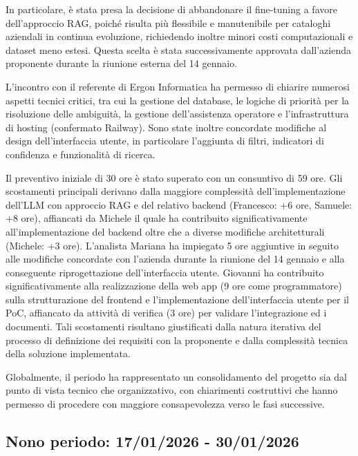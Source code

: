 \documentclass[a4paper, 11pt, oneside]{scrartcl} %
\begin{document}
In particolare, è stata presa la decisione di abbandonare il fine-tuning a favore dell'approccio RAG, poiché risulta più flessibile e manutenibile per cataloghi aziendali in continua evoluzione, richiedendo inoltre minori costi computazionali e dataset meno estesi. Questa scelta è stata successivamente approvata dall'azienda proponente durante la riunione esterna del 14 gennaio.

L'incontro con il referente di Ergon Informatica ha permesso di chiarire numerosi aspetti tecnici critici, tra cui la gestione del database, le logiche di priorità per la risoluzione delle ambiguità, la gestione dell'assistenza operatore e l'infrastruttura di hosting (confermato Railway). Sono state inoltre concordate modifiche al design dell'interfaccia utente, in particolare l'aggiunta di filtri, indicatori di confidenza e funzionalità di ricerca.

Il preventivo iniziale di 30 ore è stato superato con un consuntivo di 59 ore. Gli scostamenti principali derivano dalla maggiore complessità dell'implementazione dell'LLM con approccio RAG e del relativo backend (Francesco: +6 ore, Samuele: +8 ore), affiancati da Michele il quale ha contribuito significativamente all'implementazione del backend oltre che a diverse modifiche architetturali (Michele: +3 ore). L'analista Mariana ha impiegato 5 ore aggiuntive in seguito alle modifiche concordate con l'azienda durante la riunione del 14 gennaio e alla conseguente riprogettazione dell'interfaccia utente. Giovanni ha contribuito significativamente alla realizzazione della web app (9 ore come programmatore) sulla strutturazione del frontend e l'implementazione dell'interfaccia utente per il PoC, affiancato da attività di verifica (3 ore) per validare l'integrazione ed i documenti. Tali scostamenti risultano giustificati dalla natura iterativa del processo di definizione dei requisiti con la proponente e dalla complessità tecnica della soluzione implementata.

Globalmente, il periodo ha rappresentato un consolidamento del progetto sia dal punto di vista tecnico che organizzativo, con chiarimenti costruttivi che hanno permesso di procedere con maggiore consapevolezza verso le fasi successive.
\newpage


\subsection{Nono periodo: 17/01/2026 - 30/01/2026}
\end{document}
